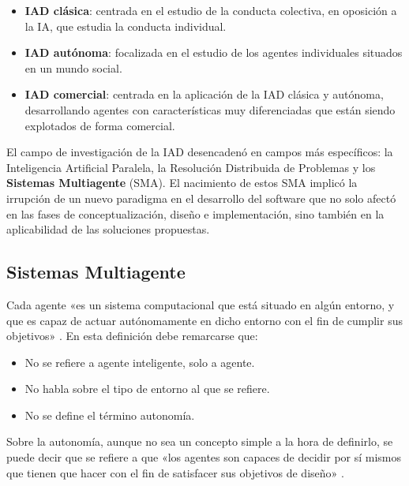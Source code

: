 \begin{itemize}
\item \textbf{\acs{IAD} clásica}: centrada en el estudio de la conducta colectiva, en oposición a la \acs{IA}, que estudia la conducta individual.
\item \textbf{\acs{IAD} autónoma}: focalizada en el estudio de los agentes individuales situados en un mundo social.
\item \textbf{\acs{IAD} comercial}: centrada en la aplicación de la \acs{IAD} clásica y autónoma, desarrollando agentes con características muy
diferenciadas que están siendo explotados de forma comercial.
\end{itemize}

El campo de investigación de la \acs{IAD} desencadenó en campos más específicos: la Inteligencia Artificial Paralela, la Resolución Distribuida de Problemas y los \textbf{Sistemas Multiagente} (\acs{SMA}). El nacimiento de estos \acs{SMA} implicó la irrupción de un nuevo paradigma en el desarrollo del software que no solo afectó en las fases de conceptualización, diseño e implementación, sino también en la aplicabilidad de las soluciones propuestas. 

\subsection{Sistemas Multiagente}
\label{sec:sismultiagente}

Cada agente «es un sistema computacional que está situado en algún entorno, y que es capaz de actuar autónomamente en dicho entorno con el fin de cumplir sus objetivos» \cite{agente}. En esta definición debe remarcarse que:
\begin{itemize}
\item No se refiere a agente inteligente, solo a agente.
\item No habla sobre el tipo de entorno al que se refiere.
\item No se define el término autonomía.
\end{itemize}

Sobre la autonomía, aunque no sea un concepto simple a la hora de definirlo, se puede decir que se refiere a que «los agentes son capaces de decidir por sí mismos que tienen que hacer con el fin de satisfacer sus objetivos de diseño» \cite{PLANIFICACION3}. 

\clearpage

